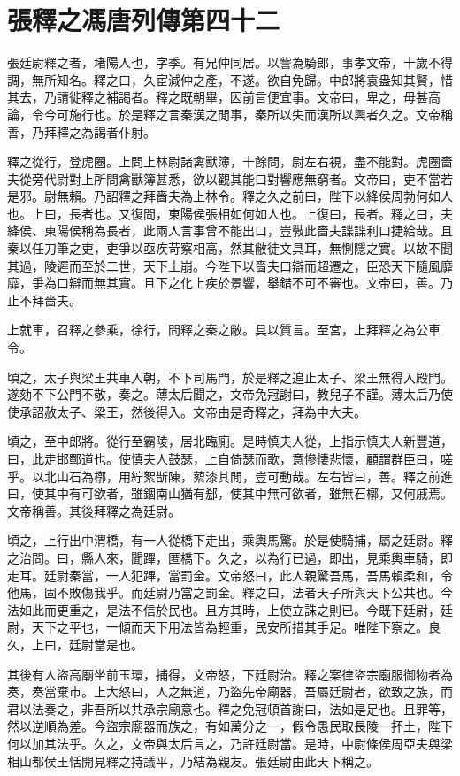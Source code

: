 \chapter{張釋之馮唐列傳第四十二}

張廷尉釋之者，堵陽人也，字季。有兄仲同居。以訾為騎郎，事孝文帝，十歲不得調，無所知名。釋之曰，久宦減仲之產，不遂。欲自免歸。中郎將袁盎知其賢，惜其去，乃請徙釋之補謁者。釋之既朝畢，因前言便宜事。文帝曰，卑之，毋甚高論，令今可施行也。於是釋之言秦漢之閒事，秦所以失而漢所以興者久之。文帝稱善，乃拜釋之為謁者仆射。

釋之從行，登虎圈。上問上林尉諸禽獸簿，十餘問，尉左右視，盡不能對。虎圈嗇夫從旁代尉對上所問禽獸簿甚悉，欲以觀其能口對響應無窮者。文帝曰，吏不當若是邪。尉無賴。乃詔釋之拜嗇夫為上林令。釋之久之前曰，陛下以絳侯周勃何如人也。上曰，長者也。又復問，東陽侯張相如何如人也。上復曰，長者。釋之曰，夫絳侯、東陽侯稱為長者，此兩人言事曾不能出口，豈斅此嗇夫諜諜利口捷給哉。且秦以任刀筆之吏，吏爭以亟疾苛察相高，然其敝徒文具耳，無惻隱之實。以故不聞其過，陵遲而至於二世，天下土崩。今陛下以嗇夫口辯而超遷之，臣恐天下隨風靡靡，爭為口辯而無其實。且下之化上疾於景響，舉錯不可不審也。文帝曰，善。乃止不拜嗇夫。

上就車，召釋之參乘，徐行，問釋之秦之敝。具以質言。至宮，上拜釋之為公車令。

頃之，太子與梁王共車入朝，不下司馬門，於是釋之追止太子、梁王無得入殿門。遂劾不下公門不敬，奏之。薄太后聞之，文帝免冠謝曰，教兒子不謹。薄太后乃使使承詔赦太子、梁王，然後得入。文帝由是奇釋之，拜為中大夫。

頃之，至中郎將。從行至霸陵，居北臨廁。是時慎夫人從，上指示慎夫人新豐道，曰，此走邯鄲道也。使慎夫人鼓瑟，上自倚瑟而歌，意慘悽悲懷，顧謂群臣曰，嗟乎。以北山石為槨，用紵絮斮陳，蕠漆其閒，豈可動哉。左右皆曰，善。釋之前進曰，使其中有可欲者，雖錮南山猶有郄，使其中無可欲者，雖無石槨，又何戚焉。文帝稱善。其後拜釋之為廷尉。

頃之，上行出中渭橋，有一人從橋下走出，乘輿馬驚。於是使騎捕，屬之廷尉。釋之治問。曰，縣人來，聞蹕，匿橋下。久之，以為行已過，即出，見乘輿車騎，即走耳。廷尉秦當，一人犯蹕，當罰金。文帝怒曰，此人親驚吾馬，吾馬賴柔和，令他馬，固不敗傷我乎。而廷尉乃當之罰金。釋之曰，法者天子所與天下公共也。今法如此而更重之，是法不信於民也。且方其時，上使立誅之則已。今既下廷尉，廷尉，天下之平也，一傾而天下用法皆為輕重，民安所措其手足。唯陛下察之。良久，上曰，廷尉當是也。

其後有人盜高廟坐前玉環，捕得，文帝怒，下廷尉治。釋之案律盜宗廟服御物者為奏，奏當棄市。上大怒曰，人之無道，乃盜先帝廟器，吾屬廷尉者，欲致之族，而君以法奏之，非吾所以共承宗廟意也。釋之免冠頓首謝曰，法如是足也。且罪等，然以逆順為差。今盜宗廟器而族之，有如萬分之一，假令愚民取長陵一抔土，陛下何以加其法乎。久之，文帝與太后言之，乃許廷尉當。是時，中尉條侯周亞夫與梁相山都侯王恬開見釋之持議平，乃結為親友。張廷尉由此天下稱之。

